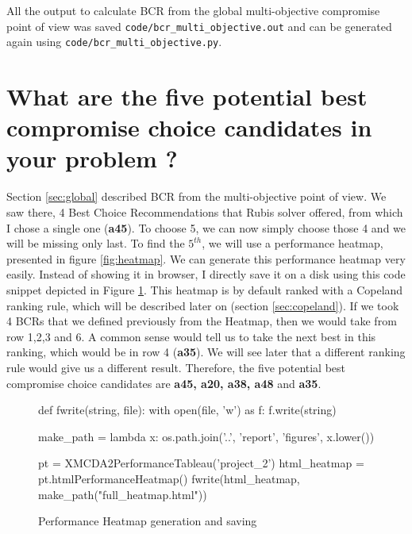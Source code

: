\documentclass[a4paper]{article}
\begin{document}
All the output to calculate BCR from the global multi-objective compromise point of view was saved \texttt{code/bcr\_multi\_objective.out} and can be generated again using \texttt{code/bcr\_multi\_objective.py}.

\section{What are the five potential best compromise choice candidates in your problem ?}
\label{sec:two}

Section \ref{sec:global} described BCR from the multi-objective point of view. We saw there, 4 Best Choice Recommendations that Rubis solver offered, from which I chose a single one (\textbf{a45}). To choose 5, we can now simply choose those 4 and we will be missing only last. To find the $5^{th}$, we will use a performance heatmap, presented in figure \ref{fig:heatmap}. We can generate this performance heatmap very easily. Instead of showing it in browser, I directly save it on a disk using this code snippet depicted in Figure \ref{lst:html}. This heatmap is by default ranked with a Copeland ranking rule, which will be described later on (section \ref{sec:copeland}). If we took 4 BCRs that we defined previously from the Heatmap, then we would take from row 1,2,3 and 6. A common sense would tell us to take the next best in this ranking, which would be in row 4 (\textbf{a35}). We will see later that a different ranking rule would give us a different result. Therefore, the five potential best compromise choice candidates are \textbf{a45, a20, a38, a48} and \textbf{a35}.
\begin{figure}[H]
	\begin{center}
		\begin{python}
def fwrite(string, file):
  with open(file, 'w') as f:
    f.write(string)
    
make_path = lambda x: os.path.join('..', 'report', 'figures', x.lower())

pt = XMCDA2PerformanceTableau('project_2')
html_heatmap = pt.htmlPerformanceHeatmap()
fwrite(html_heatmap, make_path("full_heatmap.html"))    
		\end{python}
	\end{center}
	\caption{Performance Heatmap generation and saving}
	\label{lst:html}
\end{figure}
\end{document}
